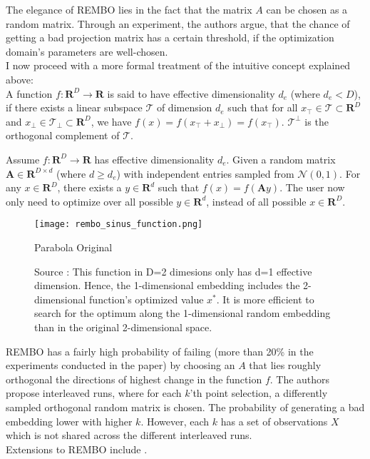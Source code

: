 The elegance of REMBO lies in the fact that the matrix $A$ can be chosen as a random matrix.
Through an experiment, the authors argue, that the chance of getting a bad projection matrix has a certain threshold, if the optimization domain's parameters are well-chosen. \\

I now proceed with a more formal treatment of the intuitive concept explained above: \\

\cite{Wang2013}
A function $f : \mathbf{R}^D \rightarrow \mathbf{R}$ is said to have effective dimensionality $d_e$ (where $d_e < D$), if there exists a linear subspace $\mathcal{T}$ of dimension $d_e$ such that for all $ x_\top \in \mathcal{T} \subset \mathbf{R}^D $ and $x_\perp \in \mathcal{T_\perp} \subset \mathbf{R}^D $, we have $ f(x) = f(x_\top +x_\perp ) = f(x_\top)$.
$\mathcal{T^\perp}$ is the orthogonal complement of $\mathcal{T}$.

Assume $ f : \mathbf{R}^D \rightarrow \mathbf{R} $ has effective dimensionality $d_e$.
Given a random matrix $ \mathbf{A} \in \mathbf{R}^{D \times d} $ (where $d \geq d_e$) with independent entries sampled from $ \mathcal{N}(0, 1) $.
For any $ x \in \mathbf{R}^D $, there exists a $y \in \mathbf{R}^d $ such that $ f(x) = f(\mathbf{A} y ) $.
The user now only need to optimize over all possible $y \in \mathbf{R}^d$, instead of all possible $x \in \mathbf{R}^D $. \\


\begin{figure}[H]
    \centering
        \texttt{[image: rembo\_sinus\_function.png]}
        \caption{Parabola Original}
        \label{fig:gull}
    \caption{
    Source \citep{Wang2013}: This function in D=2 dimesions only has d=1 effective dimension.
    Hence, the 1-dimensional embedding includes the 2-dimensional function’s optimized value $x^*$. 
    It is more efficient to search for the optimum along the 1-dimensional random embedding than in the original 2-dimensional space.
    }\label{fig:animals}
\end{figure}

REMBO has a fairly high probability of failing (more than 20\% in the experiments conducted in the paper) by choosing an $A$ that lies roughly orthogonal the directions of highest change in the function $f$.
The authors propose interleaved runs, where for each $k$'th point selection, a differently sampled orthogonal random matrix is chosen. 
The probability of generating a bad embedding lower with higher $k$.
However, each $k$ has a set of observations $X$ which is not shared across the different interleaved runs. \\
Extensions to REMBO include \citep{RemboExtension}.

